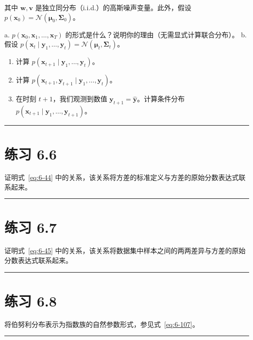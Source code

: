 其中 $ \boldsymbol{w}, \boldsymbol{v} $ 是独立同分布（i.i.d.）的高斯噪声变量。此外，假设 $ p(\boldsymbol{x}_0) = \mathcal{N}(\boldsymbol{\mu}_0, \boldsymbol{\Sigma}_0) $。

a. $ p(\boldsymbol{x}_0, \boldsymbol{x}_1, \ldots, \boldsymbol{x}_T) $ 的形式是什么？说明你的理由（无需显式计算联合分布）。 b. 假设 $ p(\boldsymbol{x}_t \mid \boldsymbol{y}_1, \ldots, \boldsymbol{y}_t) = \mathcal{N}(\boldsymbol{\mu}_t, \boldsymbol{\Sigma}_t) $。

\begin{enumerate}
\item 计算 $ p(\boldsymbol{x}_{t+1} \mid \boldsymbol{y}_1, \ldots, \boldsymbol{y}_t) $。
\item 计算 $ p(\boldsymbol{x}_{t+1}, \boldsymbol{y}_{t+1} \mid \boldsymbol{y}_1, \ldots, \boldsymbol{y}_t) $。
\item 在时刻 $ t + 1 $，我们观测到数值 $ \boldsymbol{y}_{t+1} = \hat{\boldsymbol{y}} $。计算条件分布 $ p(\boldsymbol{x}_{t+1} \mid \boldsymbol{y}_1, \ldots, \boldsymbol{y}_{t+1}) $。
\end{enumerate}

\medskip\hrule\medskip

\section*{练习 6.6}

证明式~\eqref{eq:6-44} 中的关系，该关系将方差的标准定义与方差的原始分数表达式联系起来。

\medskip\hrule\medskip

\section*{练习 6.7}

证明式~\eqref{eq:6-45} 中的关系，该关系将数据集中样本之间的两两差异与方差的原始分数表达式联系起来。

\medskip\hrule\medskip

\section*{练习 6.8}

将伯努利分布表示为指数族的自然参数形式，参见式~\eqref{eq:6-107}。

\medskip\hrule\medskip

